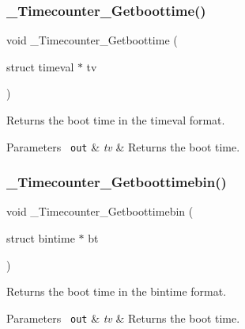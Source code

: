 \subsubsection{\texorpdfstring{\_Timecounter\_Getboottime()}{\_Timecounter\_Getboottime()}}
{\footnotesize\ttfamily void \+\_\+\+Timecounter\+\_\+\+Getboottime (\begin{DoxyParamCaption}\item[{struct timeval $\ast$}]{tv }\end{DoxyParamCaption})}



Returns the boot time in the timeval format. 


\begin{DoxyParams}[1]{Parameters}
\mbox{\texttt{ out}}  & {\em tv} & Returns the boot time. \\
\hline
\end{DoxyParams}
\mbox{\label{group__RTEMSScoreTimecounter_ga41f147a1c7305dbf07ed216067c44428}} 
\subsubsection{\texorpdfstring{\_Timecounter\_Getboottimebin()}{\_Timecounter\_Getboottimebin()}}
{\footnotesize\ttfamily void \+\_\+\+Timecounter\+\_\+\+Getboottimebin (\begin{DoxyParamCaption}\item[{struct bintime $\ast$}]{bt }\end{DoxyParamCaption})}



Returns the boot time in the bintime format. 


\begin{DoxyParams}[1]{Parameters}
\mbox{\texttt{ out}}  & {\em tv} & Returns the boot time. \\
\hline
\end{DoxyParams}
\mbox{\label{group__RTEMSScoreTimecounter_ga84743bc3a2615a6b9d7447317cfcb3dd}} 
